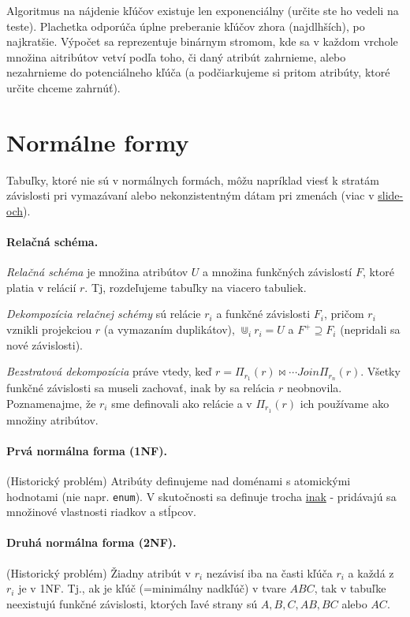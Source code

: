 \documentclass[10pt,a4paper]{article}
\begin{document}
Algoritmus na nájdenie kľúčov existuje len exponenciálny (určite ste ho vedeli na teste). Plachetka odporúča úplne preberanie kľúčov zhora (najdlhších), po najkratšie. Výpočet sa reprezentuje binárnym stromom, kde sa v každom vrchole množina aitribútov vetví podľa toho, či  daný atribút zahrnieme, alebo nezahrnieme do potenciálneho kľúča (a podčiarkujeme si pritom atribúty, ktoré určite chceme zahrnúť). 

\section{Normálne formy} 

Tabuľky, ktoré nie sú v normálnych formách, môžu napríklad viesť k stratám závislosti pri vymazávaní alebo nekonzistentným dátam pri zmenách (viac v \href{http://www.dcs.fmph.uniba.sk/~plachetk/TEACHING/DB2011/db2011_8.pdf}{slide-och}).

\paragraph{Relačná schéma.}
\emph{Relačná schéma} je množina atribútov $U$ a množina funkčných závislostí $F$, ktoré platia v relácií $r$. Tj, rozdeľujeme tabuľky na viacero tabuliek. 

\emph{Dekompozícia relačnej schémy} sú relácie $r_i$ a funkčné závislosti $F_i$, pričom $r_i$ vznikli projekciou $r$ (a vymazaním duplikátov), $\Cup_i r_i = U$ a $F^+ \supseteq F_i$ (nepridali sa nové závislosti).

\emph{Bezstratová dekompozícia} práve vtedy, keď $r = \Pi_{r_1}(r) \Join \cdots Join \Pi_{r_n}(r)$. Všetky funkčné závislosti sa museli zachovať, inak by sa relácia $r$ neobnovila. Poznamenajme, že $r_i$ sme definovali ako relácie a v $\Pi_{r_1}(r) $ ich používame ako množiny atribútov. 

\paragraph{Prvá normálna forma (1NF).} (Historický problém) Atribúty definujeme nad doménami s atomickými hodnotami (nie napr. \verb|enum|). V skutočnosti sa definuje trocha \href{http://en.wikipedia.org/wiki/First_normal_form}{inak} - pridávajú sa množinové vlastnosti riadkov a stĺpcov. 

\paragraph{Druhá normálna forma (2NF).} (Historický problém) Žiadny atribút v $r_i$ nezávisí iba na časti kľúča $r_i$ a každá z $r_i$ je v 1NF. Tj., ak je kľúč (=minimálny nadkľúč) v tvare $ABC$, tak v tabuľke neexistujú funkčné závislosti, ktorých ľavé strany sú $A,B,C,AB,BC$ alebo $AC$. 
\end{document}
